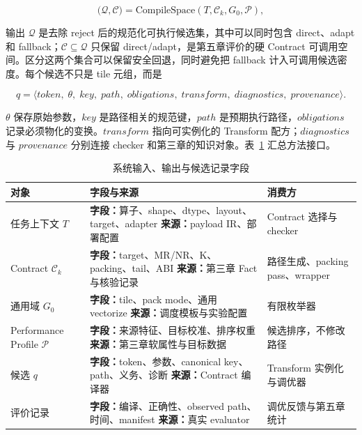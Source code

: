 \begin{equation}
\bigl(\mathcal{Q},\mathcal{C}\bigr)
=
\mathrm{CompileSpace}(T,\mathcal{C}_k,G_0,\mathcal{P}),
\label{eq:chapter4-space-compile}
\end{equation}

输出 $\mathcal{Q}$ 是去除 reject 后的规范化可执行候选集，其中可以同时包含 direct、adapt 和 fallback；$\mathcal{C}\subseteq\mathcal{Q}$ 只保留 direct/adapt，是第五章评价的硬 Contract 可调用空间。区分这两个集合可以保留安全回退，同时避免把 fallback 计入可调用候选密度。每个候选不只是 tile 元组，而是

\begin{equation}
q=\langle
token,\;\theta,\;key,\;path,\;obligations,\;transform,\;
diagnostics,\;provenance
\rangle .
\label{eq:chapter4-candidate-record}
\end{equation}

$\theta$ 保存原始参数，$key$ 是路径相关的规范键，$path$ 是预期执行路径，$obligations$ 记录必须物化的变换。$transform$ 指向可实例化的 Transform 配方；$diagnostics$ 与 $provenance$ 分别连接 checker 和第三章的知识对象。表~\ref{tab:chapter4-io} 汇总方法接口。

\begin{table}[!htbp]
  \centering
  \caption{系统输入、输出与候选记录字段}
  \label{tab:chapter4-io}
  \begingroup
  \begin{tabularx}{\textwidth}{
    @{}
    >{\centering\arraybackslash}p{}
    >{\raggedright\arraybackslash}p{}
    >{\raggedright\arraybackslash}X
    @{}
  }
    \toprule
    \textbf{对象} & \textbf{字段与来源} & \textbf{消费方} \\
    \midrule
    任务上下文 $T$ &
    \textbf{字段：}算子、shape、dtype、layout、target、adapter
    \newline \textbf{来源：}payload IR、部署配置 &
    Contract 选择与 checker \\
    Contract $\mathcal{C}_k$ &
    \textbf{字段：}target、MR/NR、K、packing、tail、ABI
    \newline \textbf{来源：}第三章 Fact 与核验记录 &
    路径生成、packing pass、wrapper \\
    通用域 $G_0$ &
    \textbf{字段：}tile、pack mode、通用 vectorize
    \newline \textbf{来源：}调度模板与实验配置 &
    有限枚举器 \\
    Performance Profile $\mathcal{P}$ &
    \textbf{字段：}来源特征、目标校准、排序权重
    \newline \textbf{来源：}第三章软属性与目标数据 &
    候选排序，不修改路径 \\
    候选 $q$ &
    \textbf{字段：}token、参数、canonical key、path、义务、诊断
    \newline \textbf{来源：}Contract 编译器 &
    Transform 实例化与调优器 \\
    评价记录 &
    \textbf{字段：}编译、正确性、observed path、时间、manifest
    \newline \textbf{来源：}真实 evaluator &
    调优反馈与第五章统计 \\
    \bottomrule
  \end{tabularx}
  \endgroup
\end{table}

